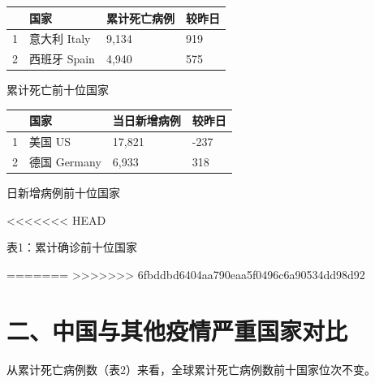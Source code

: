 \documentclass[11,]{article}
\begin{document}
\begin{minipage}{\textwidth}
        \begin{minipage}[t]{0.5\textwidth}
            \centering
            \begin{tabular}{llll}
            \hline
             & 国家        & 累计死亡病例 & 较昨⽇ \\
            \hline
            1 & 意⼤利 Italy & 9,134  & 919 \\
            2 & 西班⽛ Spain & 4,940  & 575 \\
            \hline
            \end{tabular}
            \makeatletter{}\makeatother\caption{累计死亡前十位国家}
        \end{minipage}
        \begin{minipage}[t]{0.5\textwidth}
            \centering
            \begin{tabular}{llll}
            \hline
              & 国家         & 当⽇新增病例 & 较昨日  \\
            \hline
            1 & 美国 US      & 17,821 & -237 \\
            2 & 德国 Germany & 6,933  & 318 \\
            \hline
        \end{tabular}
      \makeatletter{}\makeatother\caption{⽇新增病例前十位国家}
    \end{minipage}
\end{minipage}

\textless{}\textless{}\textless{}\textless{}\textless{}\textless{}\textless{}
HEAD

\textcolor{glaucous}{表1：累计确诊前十位国家}

=======
\textgreater{}\textgreater{}\textgreater{}\textgreater{}\textgreater{}\textgreater{}\textgreater{}
6fbddbd6404aa790eaa5f0496c6a90534dd98d92

\hypertarget{section-2}{%
\section{\texorpdfstring{\textcolor{glaucous}{二、中国与其他疫情严重国家对比}}{}}\label{section-2}}

从累计死亡病例数（表2）来看，全球累计死亡病例数前十国家位次不变。
\end{document}
